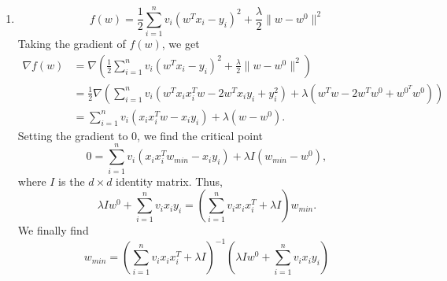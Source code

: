 \begin{enumerate}
\item
\begin{equation}
f(w) = \frac{1}{2}\sum_{i=1}^{n} v_{i}\left(w^{T}x_{i} - y_{i}\right)^{2}+\frac{\lambda}{2}\| w-w^{0}\|^{2}
\end{equation}
Taking the gradient of $f(w)$, we get
\begin{align}
\nabla f(w) &= \nabla\left(\frac{1}{2}\sum_{i=1}^{n} v_{i}\left(w^{T}x_{i} - y_{i}\right)^{2}+\frac{\lambda}{2}\| w-w^{0}\|^{2}\right)\\
&=\frac{1}{2}\nabla\left(\sum_{i=1}^{n}v_{i}\left(w^{T}x_{i}x_{i}^{T}w-2w^{T}x_{i}y_{i}+y_{i}^{2}\right)+\lambda\left(w^{T}w-2w^{T}w^{0}+w^{0^{T}}w^{0}\right) \right)\nonumber\\
&= \sum_{i=1}^{n}v_{i}\left(x_{i}x_{i}^{T}w-x_{i}y_{i}\right)+\lambda\left(w-w^{0}\right)\nonumber.
\end{align}
Setting the gradient to 0, we find the critical point
\begin{equation}
0 = \sum_{i=1}^{n}v_{i}\left(x_{i}x_{i}^{T}w_{min}-x_{i}y_{i}\right)+\lambda I\left(w_{min}-w^{0}\right),
\end{equation}
where $I$ is the $d\times d$ identity matrix. Thus,
\begin{equation}
\lambda Iw^{0} + \sum_{i=1}^{n} v_{i}x_{i}y_{i}= \left(\sum_{i=1}^{n}v_{i}x_{i}x_{i}^{T}+\lambda I\right)w_{min}.
\end{equation}
We finally find 
\begin{equation}
w_{min} = \left(\sum_{i=1}^{n}v_{i}x_{i}x_{i}^{T}+\lambda I\right)^{-1}\left(\lambda Iw^{0} + \sum_{i=1}^{n} v_{i}x_{i}y_{i}\right)
\end{equation}
\end{enumerate} 

